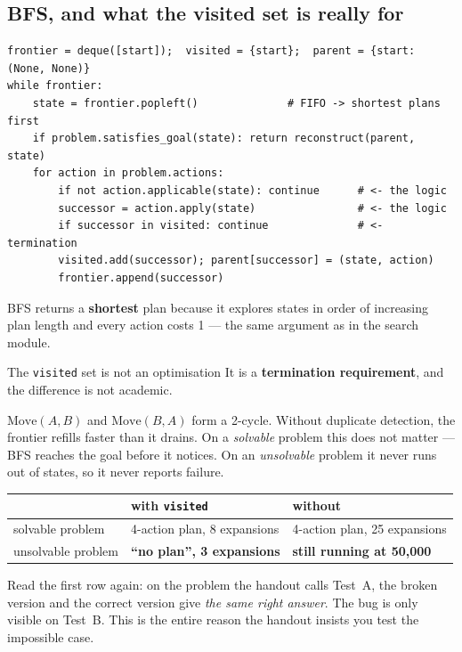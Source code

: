 \documentclass[11pt,a4paper]{article}
\begin{document}
\subsection{BFS, and what the visited set is really for}

\begin{lstlisting}
frontier = deque([start]);  visited = {start};  parent = {start: (None, None)}
while frontier:
    state = frontier.popleft()              # FIFO -> shortest plans first
    if problem.satisfies_goal(state): return reconstruct(parent, state)
    for action in problem.actions:
        if not action.applicable(state): continue      # <- the logic
        successor = action.apply(state)                # <- the logic
        if successor in visited: continue              # <- termination
        visited.add(successor); parent[successor] = (state, action)
        frontier.append(successor)
\end{lstlisting}

BFS returns a \textbf{shortest} plan because it explores states in order of
increasing plan length and every action costs 1 --- the same argument as in the
search module.

\begin{warnbox}{The \texttt{visited} set is not an optimisation}
It is a \textbf{termination requirement}, and the difference is not academic.

$\mathrm{Move}(A,B)$ and $\mathrm{Move}(B,A)$ form a 2-cycle. Without duplicate
detection, the frontier refills faster than it drains. On a \emph{solvable}
problem this does not matter --- BFS reaches the goal before it notices. On an
\emph{unsolvable} problem it never runs out of states, so it never reports
failure.

\begin{center}
\small
\begin{tabular}{@{}lll@{}}
\toprule
& \textbf{with \texttt{visited}} & \textbf{without} \\
\midrule
solvable problem   & 4-action plan, 8 expansions & 4-action plan, 25 expansions \\
unsolvable problem & \textbf{``no plan'', 3 expansions} & \textbf{still running at 50{,}000} \\
\bottomrule
\end{tabular}
\end{center}

Read the first row again: on the problem the handout calls Test~A, the broken
version and the correct version give \emph{the same right answer}. The bug is
only visible on Test~B. This is the entire reason the handout insists you test
the impossible case.
\end{warnbox}
\end{document}
